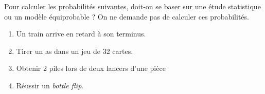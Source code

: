 
Pour calculer les probabilités suivantes, doit-on se baser sur une étude statistique ou un modèle équiprobable ? On  ne demande pas de calculer ces probabilités.

\begin{enumerate}
\item Un train arrive en retard à son terminus.
\item Tirer un as dans un jeu de 32 cartes.
\item Obtenir 2 piles lors de deux lancers d'une pièce
\item Réussir un \textit{bottle flip}.
\end{enumerate}